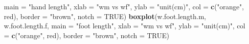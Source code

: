 \documentclass[]{article}
\newenvironment{Shaded}{\begin{snugshade}}{\end{snugshade}}
\newcommand{\DataTypeTok}[1]{\textcolor[rgb]{0.13,0.29,0.53}{#1}}
\newcommand{\KeywordTok}[1]{\textcolor[rgb]{0.13,0.29,0.53}{\textbf{#1}}}
\newcommand{\NormalTok}[1]{#1}
\newcommand{\OtherTok}[1]{\textcolor[rgb]{0.56,0.35,0.01}{#1}}
\newcommand{\StringTok}[1]{\textcolor[rgb]{0.31,0.60,0.02}{#1}}
\begin{document}
\begin{Shaded}
\begin{Highlighting}[]
        \DataTypeTok{main =} \StringTok{"hand length"}\NormalTok{,}
        \DataTypeTok{xlab =} \StringTok{"wm vs wf"}\NormalTok{,}
        \DataTypeTok{ylab =} \StringTok{"unit(cm)"}\NormalTok{,}
        \DataTypeTok{col =} \KeywordTok{c}\NormalTok{(}\StringTok{"orange"}\NormalTok{, }\StringTok{\textquotesingle{}red\textquotesingle{}}\NormalTok{),}
        \DataTypeTok{border =} \StringTok{"brown"}\NormalTok{,}
        \DataTypeTok{notch =} \OtherTok{TRUE}\NormalTok{)}
\KeywordTok{boxplot}\NormalTok{(w.foot.length.m, w.foot.length.f,}
        \DataTypeTok{main =} \StringTok{"foot length"}\NormalTok{,}
        \DataTypeTok{xlab =} \StringTok{"wm vs wf"}\NormalTok{,}
        \DataTypeTok{ylab =} \StringTok{"unit(cm)"}\NormalTok{,}
        \DataTypeTok{col =} \KeywordTok{c}\NormalTok{(}\StringTok{"orange"}\NormalTok{, }\StringTok{\textquotesingle{}red\textquotesingle{}}\NormalTok{),}
        \DataTypeTok{border =} \StringTok{"brown"}\NormalTok{,}
        \DataTypeTok{notch =} \OtherTok{TRUE}\NormalTok{)}
\end{Highlighting}
\end{Shaded}
\end{document}
